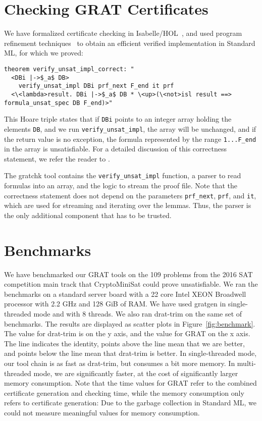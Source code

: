 \documentclass{llncs}
\newcommand{\isai}{\lstinline[language=isabelle,basicstyle=\normalsize\ttfamily\slshape]}
\begin{document}
\section{Checking GRAT Certificates}
We have formalized certificate checking in Isabelle/HOL~\cite{NPW02}, and used program refinement techniques~\cite{LaTu12,La15} to obtain an efficient verified implementation in Standard ML, 
for which we proved:
\begin{lstlisting}[language=isabelle]
theorem verify_unsat_impl_correct: "
  <DBi |->$_a$ DB> 
    verify_unsat_impl DBi prf_next F_end it prf
  <\<lambda>result. DBi |->$_a$ DB * \<up>(\<not>isl result ==> formula_unsat_spec DB F_end)>"
\end{lstlisting}
This Hoare triple states that if \isai$DBi$ points to an integer array holding the elements \isai$DB$,
and we run \isai$verify_unsat_impl$, the array will be unchanged, and if the return value is no exception,
the formula represented by the range \isai$1...F_end$ in the array is unsatisfiable. 
For a detailed discussion of this correctness statement, we refer the reader to \cite{GRATchk-proof-outline,La17_CADE}.

The gratchk tool contains the \isai{verify_unsat_impl} function, a parser to read formulas into an array, and the logic to stream the proof file.
Note that the correctness statement does not depend on the parameters \isai{prf_next}, \isai{prf}, and \isai{it}, which are used for streaming and iterating over the lemmas.
Thus, the parser is the only additional component that has to be trusted. 

\section{Benchmarks}
  We have benchmarked our GRAT tools on the 109 problems from the 2016 SAT competition main track that CryptoMiniSat could prove unsatisfiable. 
  We ran the benchmarks on a standard server board with a 22 core Intel XEON Broadwell processor with 2.2 GHz and 128 GiB of RAM.
  We have used gratgen in single-threaded mode and with 8 threads. 
  We also ran drat-trim on the same set of benchmarks. The results are displayed as scatter plots in Figure~\ref{fig:benchmark}. 
  The value for drat-trim is on the y axis, and the value for GRAT on the x axis. The line indicates the identity, \ie points above 
  the line mean that we are better, and points below the line mean that drat-trim is better. 
  In single-threaded mode, our tool chain is as fast as drat-trim, but consumes a bit more memory. 
  In multi-threaded mode, we are significantly faster, at the cost of significantly larger memory consumption.
  Note that the time values for GRAT refer to the combined certificate generation and checking time, while the memory consumption only refers 
  to certificate generation: Due to the garbage collection in Standard ML, we could not measure meaningful values for memory consumption.
\end{document}
